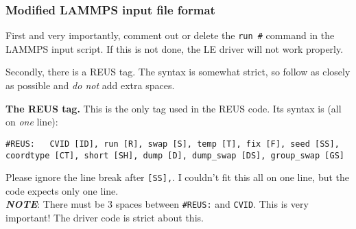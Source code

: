 \documentclass[10pt]{article}
\begin{document}
\subsubsection{Modified LAMMPS input file format}

First and very importantly, comment out
or delete the \texttt{run \#} command in the LAMMPS input script. If this is not done,
the LE driver will not work properly. 

Secondly, there is a REUS tag. The syntax is somewhat strict,
so follow as closely as possible and {\em do not} add extra spaces.

\textbf{The REUS tag.} This is the only tag used in the REUS code. Its syntax is (all on {\em one} line):
\begin{verbatim}
#REUS:   CVID [ID], run [R], swap [S], temp [T], fix [F], seed [SS], 
coordtype [CT], short [SH], dump [D], dump_swap [DS], group_swap [GS]
\end{verbatim}
Please ignore the line break after \texttt{[SS],}. I couldn't fit this all on one line, but the code expects only one line.\\
\textbf{\em NOTE}: There must be 3 spaces between \texttt{\#REUS:} and \texttt{CVID}. This is very important! The
driver code is strict about this.\\
\end{document}

